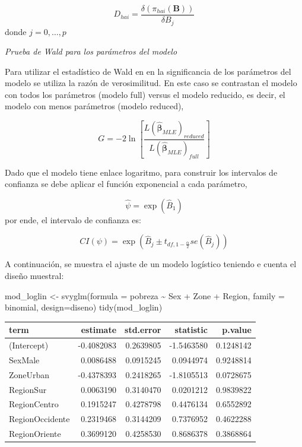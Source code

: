 \documentclass[
  12pt,
]{book}
\newenvironment{Shaded}{\begin{snugshade}}{\end{snugshade}}
\newcommand{\AttributeTok}[1]{\textcolor[rgb]{0.77,0.63,0.00}{#1}}
\newcommand{\FunctionTok}[1]{\textcolor[rgb]{0.00,0.00,0.00}{#1}}
\newcommand{\NormalTok}[1]{#1}
\newcommand{\OtherTok}[1]{\textcolor[rgb]{0.56,0.35,0.01}{#1}}
\newcommand{\SpecialCharTok}[1]{\textcolor[rgb]{0.00,0.00,0.00}{#1}}
\begin{document}
\[
    D_{hai} = \frac{\delta\left(\pi_{hai}\left(\boldsymbol{B}\right)\right)}{\delta B_{j}}
\]
donde \(j=0,\dots,p\)

\emph{Prueba de Wald para los parámetros del modelo}

Para utilizar el estadístico de Wald en en la significancia de los parámetros del modelo se utiliza la razón de verosimilitud. En este caso se contrastan el modelo con todos los parámetros (modelo full) versus el modelo reducido, es decir, el modelo con menos parámetros (modelo reduced),

\[
    G=-2\ln\left[\frac{L\left(\hat{\boldsymbol{\beta}}_{MLE}\right)_{reduced}}{L\left(\hat{\boldsymbol{\beta}}_{MLE}\right)_{full}}\right]
\]

Dado que el modelo tiene enlace logaritmo, para construir los intervalos de confianza se debe aplicar el función exponencial a cada parámetro,

\[
    \hat{\psi}=\exp\left(\hat{B}_{1}\right)
\]
por ende, el intervalo de confianza es:

\[
    CI\left(\psi\right)=\exp\left(\hat{B}_{j}\pm t_{df,1-\frac{\alpha}{2}}se\left(\hat{B}_{j}\right)\right)
\]

A continuación, se muestra el ajuste de un modelo logístico teniendo e cuenta el diseño muestral:

\begin{Shaded}
\begin{Highlighting}[]
\NormalTok{  mod\_loglin }\OtherTok{\textless{}{-}} \FunctionTok{svyglm}\NormalTok{(}\AttributeTok{formula =}\NormalTok{ pobreza }\SpecialCharTok{\textasciitilde{}}\NormalTok{ Sex }\SpecialCharTok{+}\NormalTok{ Zone }\SpecialCharTok{+}\NormalTok{ Region,}
                       \AttributeTok{family =}\NormalTok{ binomial, }
                       \AttributeTok{design=}\NormalTok{diseno)}
  \FunctionTok{tidy}\NormalTok{(mod\_loglin) }
\end{Highlighting}
\end{Shaded}

\begin{tabular}{l|r|r|r|r}
\hline
term & estimate & std.error & statistic & p.value\\
\hline
(Intercept) & -0.4082083 & 0.2639805 & -1.5463580 & 0.1248142\\
\hline
SexMale & 0.0086488 & 0.0915245 & 0.0944974 & 0.9248814\\
\hline
ZoneUrban & -0.4378393 & 0.2418265 & -1.8105513 & 0.0728675\\
\hline
RegionSur & 0.0063190 & 0.3140470 & 0.0201212 & 0.9839822\\
\hline
RegionCentro & 0.1915247 & 0.4278798 & 0.4476134 & 0.6552892\\
\hline
RegionOccidente & 0.2319468 & 0.3144209 & 0.7376952 & 0.4622288\\
\hline
RegionOriente & 0.3699120 & 0.4258530 & 0.8686378 & 0.3868864\\
\hline
\end{tabular}
\end{document}
